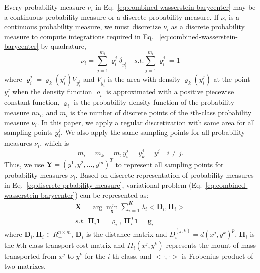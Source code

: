 Every probability measure $\nu_i$ in Eq.~\ref{eq:combined-wasserstein-barycenter} may be a continuous probability measure or a discrete probability measure.
If $\nu_i$ is a continuous probability measure,
we must discretize  $\nu_i$ as a discrete probability measure
to compute integrations required in Eq. ~\ref{eq:combined-wasserstein-barycenter} by quadrature,
\begin{equation}\label{eq:discrete-prbability-measure}
\nu_i=\sum\limits_{j=1}^{m_i}\varrho_i^j\delta_{y_i^j} \quad s.t. \sum\limits_{j=1}^{m_i}\varrho_i^j=1
\end{equation}
where $\varrho_i^j=\varrho_k(y_i^j)V_{y_i^j}$
and $V_{y_i^j}$ is the area with density $\varrho_k(y_i^j)$ at the point $y_i^j$ when the density function
$\varrho_i$ is approximated with a positive piecewise constant function,
$\varrho_i$ is the probability density function of the probability measure $nu_i$,
and $m_i$ is the number of discrete points of the $i$th-class probability measure $\nu_i$.
In this paper,
we apply a regular discretization with same area for all sampling points $y_i^j$.
We also apply the same sampling points for all probability measures $\nu_i$, 
which is
\begin{equation*}
m_i=m_k=m, y_i^j=y_k^j=y^j \quad{i\neq j}.
\end{equation*}
Thus, we use $\mathbf{Y}=(y^1,y^2,...,y^m)^T$ to represent all sampling points for probability measures $\nu_i$.
Based on discrete representation of probability measures in Eq.~\ref{eq:discrete-prbability-measure},
variational problem (Eq.~\ref{eq:combined-wasserstein-barycenter}) can be represented as:
\begin{equation}\label{eq:discrete-multi-problem}
  \begin{aligned}
  \mathbf{X}=\arg\min\limits_{\mathbf{X}}\sum\limits_{i=1}^K\lambda_i<\mathbf{D}_i,\mathbf{\Pi}_i> \\
    s.t.\ \ \mathbf{\Pi}_i\mathbf{1}=\mathbf{\varrho}_i,\ \mathbf{\Pi}_i^T\mathbf{1}=\mathbf{g}_i
  \end{aligned}
\end{equation}
where
 $\mathbf{D}_i,\mathbf{\Pi}_i\in R_+^{n\times m}$,
 $\mathbf{D}_i$ is the distance matrix and $D_i^{(j,k)}=d(x^j,y^k)^p$,
 $\mathbf{\Pi}_i$ is the $k$th-class transport cost matrix and $\Pi_i(x^j,y^k)$ represents the mount of mass transported from $x^j$ to $y^k$ for the $i$-th class,
 and $<\cdot,\cdot>$ is Frobenius product of two matrixes.


